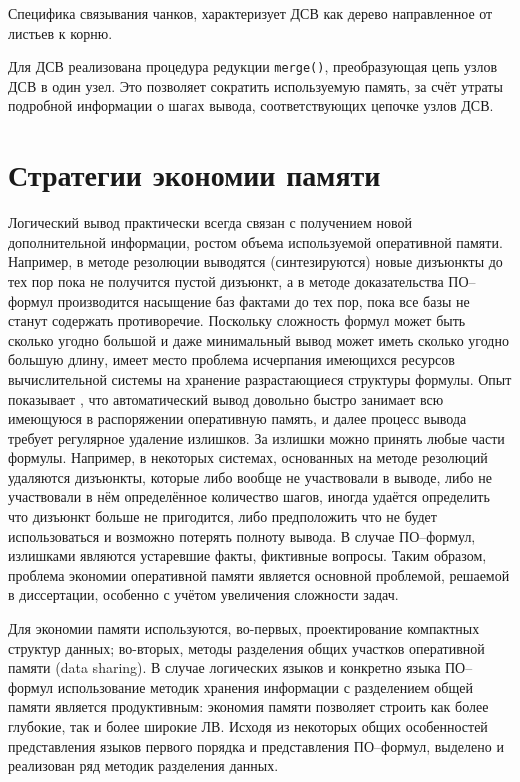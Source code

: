 Специфика связывания чанков, характеризует ДСВ как дерево направленное от листьев к корню.

Для ДСВ реализована процедура редукции {\tt merge()}, преобразующая цепь узлов ДСВ в один узел. Это позволяет сократить используемую память, за счёт утраты подробной информации о шагах вывода, соответствующих цепочке узлов ДСВ.




\section{Стратегии экономии памяти}
Логический вывод практически всегда связан с получением новой дополнительной информации, ростом объема используемой оперативной памяти. Например, в методе резолюции выводятся (синтезируются) новые дизъюнкты до тех пор пока не получится пустой дизъюнкт, а в методе доказательства ПО--формул производится насыщение баз фактами до тех пор, пока все базы не станут содержать противоречие. Поскольку сложность формул может быть сколько угодно большой и даже минимальный вывод может иметь сколько угодно большую длину, имеет место проблема исчерпания имеющихся ресурсов вычислительной системы на хранение разрастающиеся структуры формулы. Опыт показывает \cite{TermIndexingBook}, что автоматический вывод довольно быстро занимает всю имеющуюся в распоряжении оперативную память, и далее процесс вывода требует регулярное удаление излишков. За излишки можно принять любые части формулы. Например, в некоторых системах, основанных на методе резолюций удаляются дизъюнкты, которые либо вообще не участвовали в выводе, либо не участвовали в нём определённое количество шагов, иногда удаётся определить что дизъюнкт больше не пригодится, либо предположить что не будет использоваться и возможно потерять полноту вывода. В случае ПО--формул, излишками являются устаревшие факты, фиктивные вопросы. Таким образом, проблема экономии оперативной памяти является основной проблемой, решаемой в диссертации, особенно с учётом увеличения сложности задач.

Для экономии памяти используются, во-первых, проектирование компактных структур данных; во-вторых, методы разделения общих участков оперативной памяти (data sharing). В случае логических языков и конкретно языка ПО--формул использование методик хранения информации с разделением общей памяти является продуктивным: экономия памяти позволяет строить как более глубокие, так и более широкие ЛВ. Исходя из некоторых общих особенностей представления языков первого порядка и представления ПО--формул, выделено и реализован ряд методик разделения данных.


